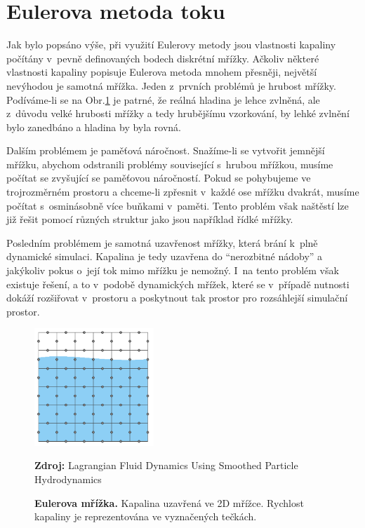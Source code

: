 \section{Eulerova metoda toku}
Jak bylo popsáno výše, při využití Eulerovy metody jsou vlastnosti kapaliny počítány v~pevně definovaných bodech diskrétní mřížky. Ačkoliv některé vlastnosti kapaliny popisuje Eulerova metoda mnohem přesněji, největší nevýhodou je samotná mřížka. Jeden z~prvních problémů je hrubost mřížky. Podíváme-li se na Obr.\ref{fig:EulerGrid} je patrné, že reálná hladina je lehce zvlněná, ale z~důvodu velké hrubosti mřížky a tedy hrubějšímu vzorkování, by lehké zvlnění bylo zanedbáno a hladina by byla rovná. 

Dalším problémem je paměťová náročnost. Snažíme-li se vytvořit jemnější mřížku, abychom odstranili problémy související s~hrubou mřížkou, musíme počítat se zvyšující se paměťovou náročností. Pokud se pohybujeme ve trojrozměrném prostoru a chceme-li zpřesnit v~každé ose mřížku dvakrát, musíme počítat s~osminásobně více buňkami v~paměti. Tento problém však naštěstí lze již řešit pomocí různých struktur jako jsou například řídké mřížky.

Posledním problémem je samotná uzavřenost mřížky, která brání k~plně dynamické simulaci. Kapalina je tedy uzavřena do \enquote{nerozbitné nádoby} a jakýkoliv pokus o~její tok mimo mřížku je nemožný. I~na tento problém však existuje řešení, a to v~podobě dynamických mřížek, které se v~případě nutnosti dokáží rozšiřovat v~prostoru a poskytnout tak prostor pro rozsáhlejší simulační prostor.
\cite{KelagerSPH} 

\begin{figure}[hbt]
	\centering
	\includegraphics[width=0.4\textwidth]{obrazky-figures/GridEuler.PNG}
	\caption{\textbf{Eulerova mřížka.} Kapalina uzavřená ve 2D mřížce. Rychlost kapaliny je reprezentována ve vyznačených tečkách.}
	\textbf{Zdroj: } Lagrangian Fluid Dynamics Using Smoothed Particle Hydrodynamics \cite{KelagerSPH}
	\label{fig:EulerGrid}
\end{figure}

